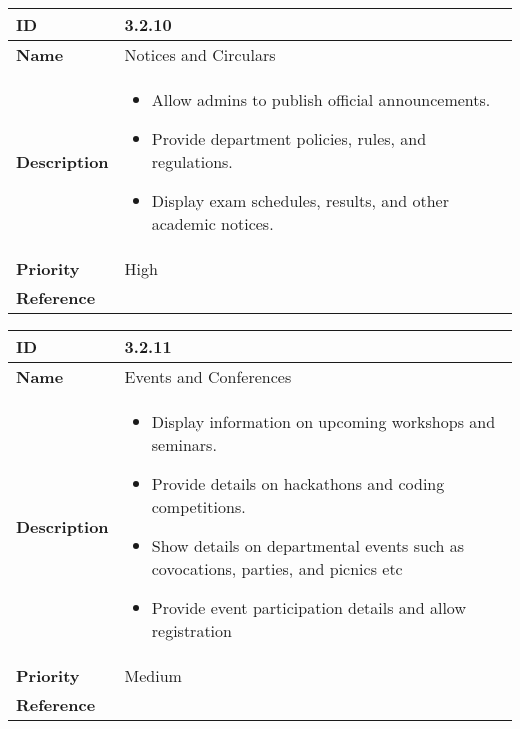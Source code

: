 \begin{center}
  \begin{tabular}{ | >{\bfseries}m{5em} | m{10cm} |  } 
    \hline
    ID & 3.2.10\\  
    \hline
    Name & Notices and Circulars \\  
    \hline
    Description & 
    \begin{itemize}
        \item Allow admins to publish official announcements.
        \item Provide department policies, rules, and regulations.
        \item Display exam schedules, results, and other academic notices.
    \end{itemize} \\ 
    \hline
    Priority & High\\
    \hline 
    Reference & \\
    \hline
    
  \end{tabular}
\end{center}

\vspace{0.5cm}

\begin{center}
\begin{tabular}{ | >{\bfseries}m{5em} | m{10cm} |  } 
  \hline
  ID & 3.2.11\\  
  \hline
  Name & Events and Conferences \\  
  \hline
  Description & 
  \begin{itemize}
      \item Display information on upcoming workshops and seminars.
      \item Provide details on hackathons and coding competitions.
      \item Show details on departmental events such as covocations, parties, and picnics etc
      \item Provide event participation details and allow registration
  \end{itemize} \\ 
  \hline
  Priority & Medium\\
  \hline 
  Reference & \\
  \hline
\end{tabular}
\end{center}

\vspace{0.5cm}


